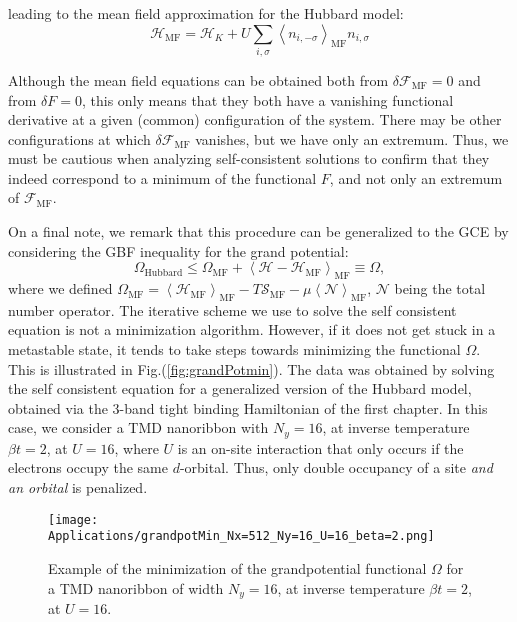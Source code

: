 leading to the mean field approximation for the Hubbard model:
\begin{equation}
\mathcal{H}_{\text{MF}} = \mathcal{H}_K + U \sum_{i, \sigma} \left\langle n_{i,- \sigma} \right\rangle_{\text{MF}} n_{i, \sigma}
\end{equation}

Although the mean field equations can be obtained both from $\delta \mathcal{F}_{\text{MF}} = 0$ and from $\delta F = 0$, this only means that they both have a vanishing functional derivative at a given (common) configuration of the system.
There may be other configurations at which $\delta \mathcal{F}_{\text{MF}}$ vanishes, but we have only an extremum.
Thus, we must be cautious when analyzing self-consistent solutions to confirm that they indeed correspond to a minimum of the functional $F$, and not only an extremum of $\mathcal{F}_{\text{MF}}$.

On a final note, we remark that this procedure can be generalized to the \ac{GCE} by considering the GBF inequality for the grand potential:
\begin{equation}\label{eq:gibbsGrand}
\Omega_{\text{Hubbard}} \le \Omega_{\text{MF}} + \left\langle \mathcal{H} - \mathcal{H}_{\text{MF}} \right\rangle_{\text{MF}} \equiv \Omega ,
\end{equation}
where we defined $\Omega_{\text{MF}} = \left\langle \mathcal{H}_{\text{MF}} \right\rangle_{\text{MF}} - T \mathcal{S}_{\text{MF}}- \mu \left\langle \mathcal{N} \right\rangle_{\text{MF}}$, $\mathcal{N}$ being the total number operator.
The iterative scheme we use to solve the self consistent equation is not a minimization algorithm.
However, if it does not get stuck in a metastable state, it tends to take steps towards minimizing the functional $\Omega$.
This is illustrated in Fig.(\ref{fig:grandPotmin}).
The data was obtained by solving the self consistent equation for a generalized version of the Hubbard model, obtained via the 3-band tight binding Hamiltonian  of the first chapter.
In this case, we consider a \acs{TMD} nanoribbon with $N_y = 16$, at inverse temperature $\beta t = 2 $, at $U = 16$, where $U$ is an on-site interaction that only occurs if the electrons occupy the same $d$-orbital.
Thus, only double occupancy of a site \emph{and an orbital} is penalized.

\begin{figure}[H]
\centering
\texttt{[image: Applications/grandpotMin\_Nx=512\_Ny=16\_U=16\_beta=2.png]}
	\caption[Example of the minimization of the grandpotential functional.]{Example of the minimization of the grandpotential functional $\Omega$ for a TMD nanoribbon of width $N_y = 16$, at inverse temperature $\beta t = 2 $, at $U = 16$.}
	\label{fig:grandPotMin}
\end{figure}